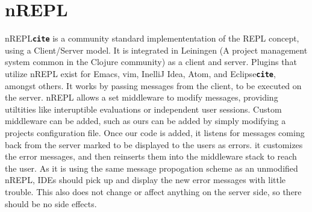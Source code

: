 \documentclass[12pt]{article}
\newcommand{\comment}[1]{{\bf \tt  {#1}}}
\begin{document}
\section{nREPL}
nREPL\comment{cite} is a community standard implemententation of the REPL concept,
 using a Client/Server model. It is integrated in Leiningen
  (A project management system common in the Clojure community) as a client and server.
 Plugins that utilize nREPL exist for Emacs, vim, InelliJ Idea, Atom, and Eclipse\comment{cite}, amongst others.
It works by passing messages from the client, to be executed on the server.
nREPL allows a set middleware to modify messages, providing utiltities
like interuptible evaluations or independent user sessions.
Custom middleware can be added, such as ours can be added by simply
modifying a projects configuration file. Once our code is added,
it listens for messages coming back from the server
marked to be displayed to the users as errors.
it customizes the error messages, and then reinserts them into the middleware stack
to reach the user. As it is using the same message propogation scheme as an unmodified nREPL,
IDEs should pick up and display the new error messages with little trouble.
This also does not change or affect anything on the server side, so there should
be no side effects.

\end{document}
